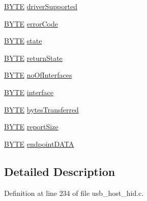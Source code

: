 \begin{DoxyCompactItemize}
\begin{tabbing}
\end{tabbing}\item 
\hyperlink{_generic_type_defs_8h_a4ae1dab0fb4b072a66584546209e7d58}{B\+Y\+T\+E} \hyperlink{struct___u_s_b___h_i_d___d_e_v_i_c_e___i_n_f_o_a4b1e154be3e32ff64a9897b950bfad72}{driver\+Supported}
\item 
\hyperlink{_generic_type_defs_8h_a4ae1dab0fb4b072a66584546209e7d58}{B\+Y\+T\+E} \hyperlink{struct___u_s_b___h_i_d___d_e_v_i_c_e___i_n_f_o_aeed843858495988cfbec7df4f05862cb}{error\+Code}
\item 
\hyperlink{_generic_type_defs_8h_a4ae1dab0fb4b072a66584546209e7d58}{B\+Y\+T\+E} \hyperlink{struct___u_s_b___h_i_d___d_e_v_i_c_e___i_n_f_o_ae0cccc3e8e24fd8bc52a62b331c9b9e4}{state}
\item 
\hyperlink{_generic_type_defs_8h_a4ae1dab0fb4b072a66584546209e7d58}{B\+Y\+T\+E} \hyperlink{struct___u_s_b___h_i_d___d_e_v_i_c_e___i_n_f_o_aea3abadeea0eff004cdfa31781557074}{return\+State}
\item 
\hyperlink{_generic_type_defs_8h_a4ae1dab0fb4b072a66584546209e7d58}{B\+Y\+T\+E} \hyperlink{struct___u_s_b___h_i_d___d_e_v_i_c_e___i_n_f_o_a9b890021112a620d72e687deae73d4c1}{no\+Of\+Interfaces}
\item 
\hyperlink{_generic_type_defs_8h_a4ae1dab0fb4b072a66584546209e7d58}{B\+Y\+T\+E} \hyperlink{struct___u_s_b___h_i_d___d_e_v_i_c_e___i_n_f_o_a6e65d646f7737013c8389976f1e27806}{interface}
\item 
\hyperlink{_generic_type_defs_8h_a4ae1dab0fb4b072a66584546209e7d58}{B\+Y\+T\+E} \hyperlink{struct___u_s_b___h_i_d___d_e_v_i_c_e___i_n_f_o_aa4bef2e44e26640289413c7724a28fc2}{bytes\+Transferred}
\item 
\hyperlink{_generic_type_defs_8h_a4ae1dab0fb4b072a66584546209e7d58}{B\+Y\+T\+E} \hyperlink{struct___u_s_b___h_i_d___d_e_v_i_c_e___i_n_f_o_af69359e07a901d54031879f3c2e85386}{report\+Size}
\item 
\hyperlink{_generic_type_defs_8h_a4ae1dab0fb4b072a66584546209e7d58}{B\+Y\+T\+E} \hyperlink{struct___u_s_b___h_i_d___d_e_v_i_c_e___i_n_f_o_a3aa356dc9da45bcfe8ae9f459ea1a69a}{endpoint\+D\+A\+T\+A}
\end{DoxyCompactItemize}


\subsection{Detailed Description}


Definition at line 234 of file usb\+\_\+host\+\_\+hid.\+c.




